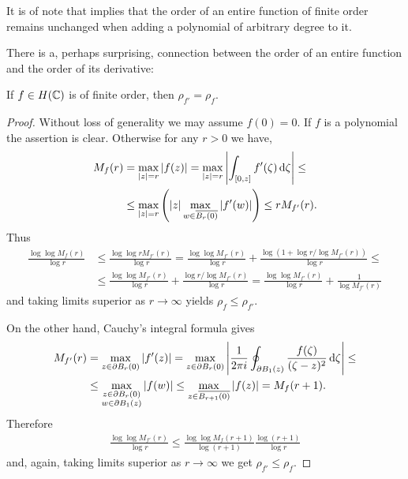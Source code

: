 It is of note that  implies that the order of an entire function of finite order remains unchanged when adding a polynomial of arbitrary degree to it.

There is a, perhaps surprising, connection between the order of an entire function and the order of its derivative:

\begin{proposition} \label{prop:order-derivative}
    If $f \in H(\mathbb{C})$ is of finite order, then $\rho_{f'} = \rho_f$.
\end{proposition}

\begin{proof}
    Without loss of generality we may assume $f(0) = 0$. If $f$ is a polynomial the assertion is clear. Otherwise for any $r > 0$ we have,
    \begin{align*}
        M_f(r) &= \max_{\vert z \vert = r} \vert f(z) \vert = \max_{\vert z \vert = r} \left\vert \int_{[0, z]} f'(\zeta) \mathop{}\!\mathrm{d} \zeta \right\vert \leq \\
        &\leq \max_{\vert z \vert = r} \left( \vert z \vert \max_{w \in \overline{B_r(0)}} \vert f'(w) \vert \right) \leq r M_{f'}(r).
    \end{align*}
    Thus
    \begin{align*}
        \frac{\log \log M_f(r)}{\log r} &\leq \frac{\log \log r M_{f'}(r)}{\log r} = \frac{\log \log M_{f'}(r)}{\log r} + \frac{\log(1 + \log r / \log M_{f'}(r))}{\log r} \leq \\
        &\leq \frac{\log \log M_{f'}(r)}{\log r} + \frac{\log r / \log M_{f'}(r)}{\log r} = \frac{\log \log M_{f'}(r)}{\log r} + \frac{1}{\log M_{f'}(r)}
    \end{align*}
    and taking limits superior as $r \to \infty$ yields $\rho_f \leq \rho_{f'}$.

    On the other hand, Cauchy's integral formula gives
    \begin{align*}
        M_{f'}(r) &= \max_{z \in \partial B_r(0)} \vert f'(z) \vert = \max_{z \in \partial B_r(0)} \left\vert \frac{1}{2\pi i} \oint_{\partial B_1(z)} \frac{f(\zeta)}{(\zeta-z)^2} \mathop{}\!\mathrm{d} \zeta \right\vert \leq \\
        &\leq \max_{\substack{z \in \partial B_r(0) \\ w \in \partial B_1(z)}} \vert f(w) \vert \leq \max_{z \in \overline{B_{r+1}(0)}} \vert f(z) \vert = M_f(r + 1).
    \end{align*}
    Therefore
    \begin{align*}
        \frac{\log \log M_{f'}(r)}{\log r} \leq \frac{\log \log M_f(r+1)}{\log (r+1)} \frac{\log (r+1)}{\log r}
    \end{align*}
    and, again, taking limits superior as $r \to \infty$ we get $\rho_{f'} \leq \rho_f$.
\end{proof}